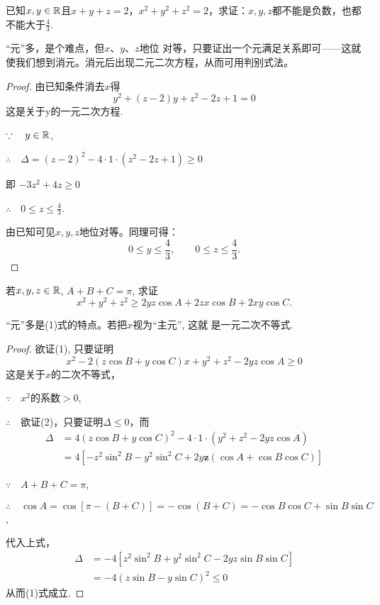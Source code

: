 \begin{example}
已知$x,y\in\mathbb{R}$且$x+y+z=2$，$x^2+y^2+z^2=2$，求证：$x,y,z$都不能是负数，也都不能大于$\frac{4}{3}$.
\end{example}

\begin{analyze}
    “元”多，是个难点，但$x$、$y$、$z$地位 对等，只要证出一个元满足关系即可——这就使我们想到消元。消元后出现二元二次方程，从而可用判别式法。
\end{analyze}

\begin{proof}
    由已知条件消去$x$得
$$y^{2}+\left(z-2\right)y+z^{2}-2z+1=0$$
这是关于y的一元二次方程.

$\because\quad y\in \mathbb{R}$,

$\therefore\quad \Delta = ( z- 2) ^{2}- 4\cdot 1\cdot ( z^{2}- 2z+ 1) \geq 0$

即   $-3z^2+4z\geq0$

$\therefore\quad 0\leq z\leq\frac{4}{3}$.

由已知可见$x,y,z$地位对等。同理可得：
$$0\le  y\le \frac{4}{3},\qquad 0\le  z\le \frac{4}{3}.$$
\end{proof}


\begin{example}
    若$x,y,z\in \mathbb{R}$, $A+B+C=\pi$, 求证
\begin{equation}
    x^2+ y^2+ z^2\geqslant 2yz\cos A+ 2zx\cos B+ 2xy\cos C.\tag{1}
\end{equation}
\end{example}

\begin{analyze}
    “元”多是(1)式的特点。若把$x$视为“主元”, 这就
是一元二次不等式.
\end{analyze}

\begin{proof}
欲证(1), 只要证明
\begin{equation}
    x^2-2(z\cos B+y\cos C)x+y^2+z^2-2yz\cos A \geq 0 \tag{2}
\end{equation}
这是关于$x$的二次不等式，

$\because \quad x^2$的系数$>0$,  
  
$\therefore\quad $欲证(2)，只要证明$\Delta\le 0$，而
\[\begin{split}
    \Delta &= 4(z\cos B+y\cos C)^2-4\cdot1\cdot(y^2+z^2-2yz\cos A)\\
&= 4[ - z^{2}\sin ^{2}B- y^{2}\sin ^{2}C+ 2y\boldsymbol{z}( \cos A+ \cos B\cos C) ]
\end{split}\]

$\because\quad A+ B+ C= \pi $,

$\therefore\quad \cos A= \cos [ \pi - ( B+ C) ] = - \cos ( B+ C)=-\cos B\cos C+\sin B\sin C$,

代入上式，
\[\begin{split}
    \Delta&=-4[z^{2}\sin^{2}B+y^{2}\sin^{2}C-2yz\sin B\sin C]\\
    &=-4(z\sin B-y\sin C)^{2}\le 0
\end{split}\]
从而(1)式成立.
\end{proof}

